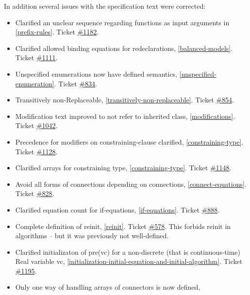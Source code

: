\documentclass[../MLS.tex]{subfiles}
\begin{document}
In addition several issues with the specification text were corrected:

\begin{itemize}
\item
  Clarified an unclear sequence regarding functions as input arguments
  in \autoref{prefix-rules}. Ticket
  \href{https://trac.modelica.org/Modelica/ticket/1182}{\#1182}.
\item
  Clarified allowed binding equations for redeclarations, \autoref{balanced-models}.
  Ticket \href{https://trac.modelica.org/Modelica/ticket/1111}{\#1111}.
\item
  Unspecified enumerations now have defined semantics, \autoref{unspecified-enumeration}.
  Ticket \href{https://trac.modelica.org/Modelica/ticket/834}{\#834}.
\item
  Transitively non-Replaceable, \autoref{transitively-non-replaceable}. Ticket
  \href{https://trac.modelica.org/Modelica/ticket/854}{\#854}.
\item
  Modification text improved to not refer to inherited class, 
  \autoref{modifications}. Ticket
  \href{https://trac.modelica.org/Modelica/ticket/1042}{\#1042}.
\item
  Precedence for modifiers on constraining-clause clarified, \autoref{constraining-type}. Ticket
  \href{https://trac.modelica.org/Modelica/ticket/1128}{\#1128}.
\item
  Clarified arrays for constraining type, \autoref{constraining-type}. Ticket
  \href{https://trac.modelica.org/Modelica/ticket/1148}{\#1148}.
\item
  Avoid all forms of connections depending on connections, 
  \autoref{connect-equations}. Ticket
  \href{https://trac.modelica.org/Modelica/ticket/828}{\#828}.
\item
  Clarified equation count for if-equations, \autoref{if-equations}. Ticket
  \href{https://trac.modelica.org/Modelica/ticket/888}{\#888}.
\item
  Complete definition of reinit, \autoref{reinit}. Ticket
  \href{https://trac.modelica.org/Modelica/ticket/578}{\#578}. This
  forbids reinit in algorithms -- but it was previously not
  well-defined.
\item
  Clarified initializaton of pre(vc) for a non-discrete (that is
  continuous-time) Real variable vc, \autoref{initialization-initial-equation-and-initial-algorithm}. Ticket
  \href{https://trac.modelica.org/Modelica/ticket/1195}{\#1195}.
\item
  Only one way of handling arrays of connectors is now defined, 

\end{itemize}
\end{document}
